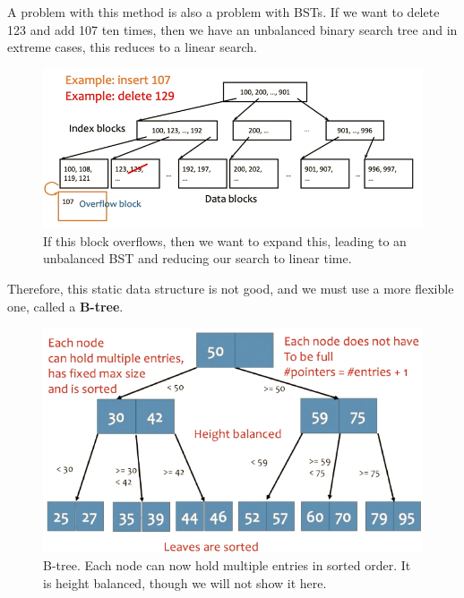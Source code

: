     A problem with this method is also a problem with BSTs. If we want to delete 123 and add 107 ten times, then we have an unbalanced binary search tree and in extreme cases, this reduces to a linear search. 

    \begin{figure}[H]
      \centering 
      \includegraphics[scale=0.4]{img/isam_problem.png}
      \caption{If this block overflows, then we want to expand this, leading to an unbalanced BST and reducing our search to linear time.} 
      \label{fig:isam_problem}
    \end{figure}
    

    \begin{definition}[B Tree]
      Therefore, this static data structure is not good, and we must use a more flexible one, called a \textbf{B-tree}.
      \begin{figure}[H]
        \centering 
        \includegraphics[scale=0.4]{img/b_tree.png}
        \caption{B-tree. Each node can now hold multiple entries in sorted order. It is height balanced, though we will not show it here.} 
        \label{fig:b_tree}
      \end{figure}
    \end{definition}

